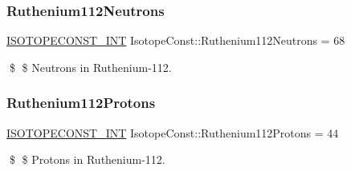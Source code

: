 \subsubsection{\texorpdfstring{Ruthenium112\+Neutrons}{Ruthenium112Neutrons}}
{\footnotesize\ttfamily \mbox{\hyperlink{group___isotope_const-_macros_ga5f18360b3e99483a35c32d789e62621c}{I\+S\+O\+T\+O\+P\+E\+C\+O\+N\+S\+T\+\_\+\+I\+NT}} Isotope\+Const\+::\+Ruthenium112\+Neutrons = 68}

\$ \$ Neutrons in Ruthenium-\/112. \mbox{\label{group___isotope_const-_ruthenium-_ru112_ga157530d0c8468841dc438f32054854e4}} 
\subsubsection{\texorpdfstring{Ruthenium112\+Protons}{Ruthenium112Protons}}
{\footnotesize\ttfamily \mbox{\hyperlink{group___isotope_const-_macros_ga5f18360b3e99483a35c32d789e62621c}{I\+S\+O\+T\+O\+P\+E\+C\+O\+N\+S\+T\+\_\+\+I\+NT}} Isotope\+Const\+::\+Ruthenium112\+Protons = 44}

\$ \$ Protons in Ruthenium-\/112. 